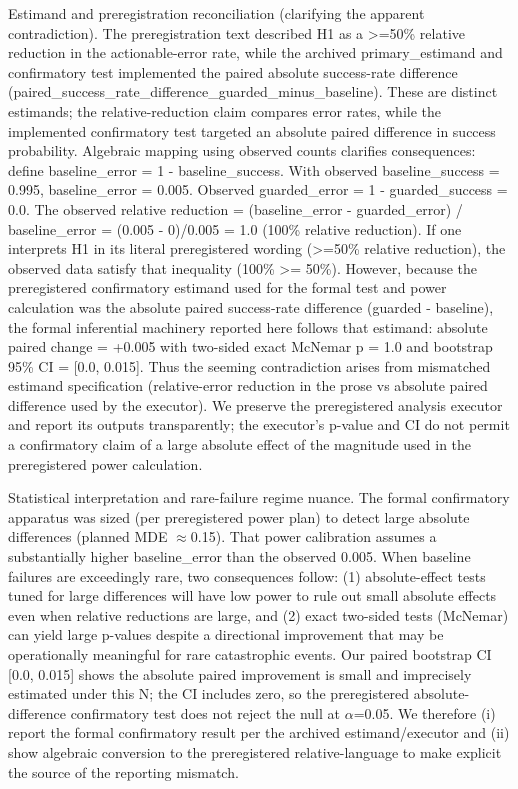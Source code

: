 \documentclass[conference]{IEEEtran}
\begin{document}
Estimand and preregistration reconciliation (clarifying the apparent contradiction). The preregistration text described H1 as a >=50\% relative reduction in the actionable-error rate, while the archived primary\_estimand and confirmatory test implemented the paired absolute success-rate difference (paired\_success\_rate\_difference\_guarded\_minus\_baseline). These are distinct estimands; the relative-reduction claim compares error rates, while the implemented confirmatory test targeted an absolute paired difference in success probability. Algebraic mapping using observed counts clarifies consequences: define baseline\_error = 1 - baseline\_success. With observed baseline\_success = 0.995, baseline\_error = 0.005. Observed guarded\_error = 1 - guarded\_success = 0.0. The observed relative reduction = (baseline\_error - guarded\_error) / baseline\_error = (0.005 - 0)/0.005 = 1.0 (100\% relative reduction). If one interprets H1 in its literal preregistered wording (>=50\% relative reduction), the observed data satisfy that inequality (100\% >= 50\%). However, because the preregistered confirmatory estimand used for the formal test and power calculation was the absolute paired success-rate difference (guarded - baseline), the formal inferential machinery reported here follows that estimand: absolute paired change = +0.005 with two-sided exact McNemar p = 1.0 and bootstrap 95\% CI = [0.0, 0.015]. Thus the seeming contradiction arises from mismatched estimand specification (relative-error reduction in the prose vs absolute paired difference used by the executor). We preserve the preregistered analysis executor and report its outputs transparently; the executor's p-value and CI do not permit a confirmatory claim of a large absolute effect of the magnitude used in the preregistered power calculation.

Statistical interpretation and rare-failure regime nuance. The formal confirmatory apparatus was sized (per preregistered power plan) to detect large absolute differences (planned MDE \ensuremath{\approx}0.15). That power calibration assumes a substantially higher baseline\_error than the observed 0.005. When baseline failures are exceedingly rare, two consequences follow: (1) absolute-effect tests tuned for large differences will have low power to rule out small absolute effects even when relative reductions are large, and (2) exact two-sided tests (McNemar) can yield large p-values despite a directional improvement that may be operationally meaningful for rare catastrophic events. Our paired bootstrap CI [0.0, 0.015] shows the absolute paired improvement is small and imprecisely estimated under this N; the CI includes zero, so the preregistered absolute-difference confirmatory test does not reject the null at \ensuremath{\alpha}=0.05. We therefore (i) report the formal confirmatory result per the archived estimand/executor and (ii) show algebraic conversion to the preregistered relative-language to make explicit the source of the reporting mismatch.
\end{document}
